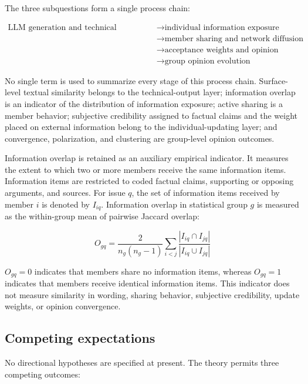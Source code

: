 \documentclass[11pt,a4paper]{article}
\begin{document}
The three subquestions form a single process chain:

\begin{equation*}
\begin{aligned}\text{LLM generation and technical configuration} &\rightarrow \text{individual information exposure} \\
&\rightarrow \text{member sharing and network diffusion} \\
&\rightarrow \text{acceptance weights and opinion updating} \\
&\rightarrow \text{group opinion evolution}\end{aligned}
\end{equation*}

No single term is used to summarize every stage of this process chain. Surface-level textual similarity belongs to the technical-output layer; information overlap is an indicator of the distribution of information exposure; active sharing is a member behavior; subjective credibility assigned to factual claims and the weight placed on external information belong to the individual-updating layer; and convergence, polarization, and clustering are group-level opinion outcomes.

Information overlap is retained as an auxiliary empirical indicator. It measures the extent to which two or more members receive the same information items. Information items are restricted to coded factual claims, supporting or opposing arguments, and sources. For issue $q$, the set of information items received by member $i$ is denoted by $I_{iq}$. Information overlap in statistical group $g$ is measured as the within-group mean of pairwise Jaccard overlap:

\begin{equation*}
O_{gq}
=
\frac{2}{n_g(n_g-1)}
\sum_{i<j}
\frac{|I_{iq}\cap I_{jq}|}{|I_{iq}\cup I_{jq}|}
\end{equation*}

$O_{gq}=0$ indicates that members share no information items, whereas $O_{gq}=1$ indicates that members receive identical information items. This indicator does not measure similarity in wording, sharing behavior, subjective credibility, update weights, or opinion convergence.

\subsection{Competing expectations}

No directional hypotheses are specified at present. The theory permits three competing outcomes:
\end{document}
